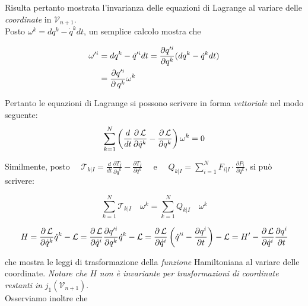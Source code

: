 Risulta pertanto mostrata l'invarianza delle equazioni di Lagrange al variare delle \textit{coordinate} in $\mathcal{V}_{n+1}$. \\

Posto $\omega^k = dq^k - \dot{q}^k dt$, un semplice calcolo mostra che

\begin{equation*}
\begin{split}
\omega'^i &= dq^k - \dot{q}'^i dt = \frac{\partial q'^i}{\partial q^k} (dq^k - \dot{q}^k dt) \\
&= \frac{\partial q'^i}{\operatorname{\partial} q^k} \omega^k
\end{split}
\end{equation*}

Pertanto le equazioni di Lagrange si possono scrivere in forma \textit{vettoriale} nel modo seguente:
\begin{equation*}
\sum_{k=1} ^{N} \left( \frac{d}{dt} \frac{\partial \operatorname{\mathcal{L}}}{\partial \dot{q}^k} - \frac{\partial \operatorname{\mathcal{L}}}{\partial q^k} \right) \omega^k = 0
\end{equation*}

Similmente, posto $\quad \mathcal{T}_{k|I} = \frac{d}{dt} \frac{\partial T_I}{\partial \dot{q}^k} - \frac{\partial T_I}{\partial q^k}\quad$ e $\quad Q_{k|I} = \sum_{i=1}^{N} F_{i|I} \cdot \frac{\partial P_i}{\partial q^k}$, si può scrivere:

\begin{equation*}
\sum_{k=1}^{N} \mathcal{T}_{k|I} \quad \omega ^k = \sum_{k=1}^{N} Q_{k|I} \quad \omega^k
\end{equation*}


\begin{equation*}
H = \frac{\partial \operatorname{\mathcal{L}}}{\partial \dot{q}^k}\dot{q}^k - \operatorname{\mathcal{L}} = \frac{\partial \operatorname{\mathcal{L}}}{\partial \dot{q}^i}\frac{\partial q'^i}{\partial q^k}\dot{q}^k - \operatorname{\mathcal{L}}
= \frac{\partial \operatorname{\mathcal{L}}}{\partial \dot{q}^i}\left(\dot{q}'^i - \frac{\partial q^i}{\partial t}\right) - \operatorname{\mathcal{L}} = H' - \frac{\partial \operatorname{\mathcal{L}}}{\partial \dot{q}^i}\frac{\partial q^i}{\partial t}
\end{equation*}

che mostra le leggi di trasformazione della \textit{funzione} Hamiltoniana al variare delle coordinate. \textit{Notare che} $H$ \textit{non è invariante per trasformazioni di coordinate restanti in} $j_1(\mathcal{V}_{n+1})$. \\

Osserviamo inoltre che

